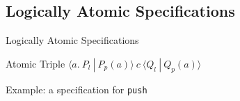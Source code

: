 \documentclass[professionalfonts, xcolor=table]{beamer}
\begin{document}
\subsection{Logically Atomic Specifications}

\begin{frame}{Logically Atomic Specifications}
  \begin{block}{Atomic Triple}
    \centering
    $\langle a.\ P_l\ |\ P_p(a)\rangle\ c\ \langle Q_l\ |\ Q_p(a)\rangle$
  \end{block}

  \pause
  \begin{block}{Example: a specification for \texttt{push}}
    \centering
  \end{block}

\end{frame}
\end{document}
